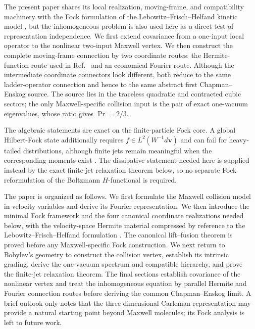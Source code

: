 \documentclass[11pt,oneside]{article}
\numberwithin{equation}{section}
\theoremstyle{definition}
\begin{document}
The present paper shares its local realization, moving-frame, and compatibility machinery with the Fock formulation of the Lebowitz--Frisch--Helfand kinetic model \cite{Karlin2026LFHFock}, but the inhomogeneous problem is also used here as a direct test of representation independence.  We first extend covariance from a one-input local operator to the nonlinear two-input Maxwell vertex.  We then construct the complete moving-frame connection by two coordinate routes: the Hermite-function route used in Ref.~\cite{Karlin2026LFHFock} and an economical Fourier route.  Although the intermediate coordinate connectors look different, both reduce to the same ladder-operator connection and hence to the same abstract first Chapman--Enskog source.  The source lies in the traceless quadratic and contracted cubic sectors; the only Maxwell-specific collision input is the pair of exact one-vacuum eigenvalues, whose ratio gives $\Pr=2/3$.

The algebraic statements are exact on the finite-particle Fock core.  A global Hilbert-Fock state additionally requires $f\in L^2(W^{-1}d\bm v)$ and can fail for heavy-tailed distributions, although finite jets remain meaningful when the corresponding moments exist \cite{CannoneKarch2010,ChoMorimotoWangYang2016}.  The dissipative statement needed here is supplied instead by the exact finite-jet relaxation theorem below, so no separate Fock reformulation of the Boltzmann $H$-functional is required.

The paper is organized as follows.  We first formulate the Maxwell collision model in velocity variables and derive its Fourier representation.  We then introduce the minimal Fock framework and the four canonical coordinate realizations needed below, with the velocity-space Hermite material compressed by reference to the Lebowitz--Frisch--Helfand formulation \cite{Karlin2026LFHFock}.  The canonical lift--fusion theorem is proved before any Maxwell-specific Fock construction.  We next return to Bobylev's geometry to construct the collision vertex, establish its intrinsic grading, derive the one-vacuum spectrum and compatible hierarchy, and prove the finite-jet relaxation theorem.  The final sections establish covariance of the nonlinear vertex and treat the inhomogeneous equation by parallel Hermite and Fourier connection routes before deriving the common Chapman--Enskog limit.  A brief outlook only notes that the three-dimensional Carleman representation may provide a natural starting point beyond Maxwell molecules; its Fock analysis is left to future work.
\end{document}
